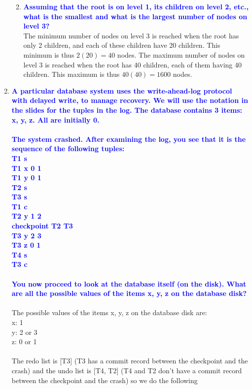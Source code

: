 \documentclass[11pt]{article}
\begin{document}
\begin{enumerate}
\begin{enumerate}
\begin{enumerate}
            \end{enumerate}        
        \item \textbf{\textcolor{blue}{Assuming that the root is on level 1, its children on level 2, etc., what is the smallest and what is the largest number of nodes on level 3?}}
            \\ The minimum number of nodes on level 3 is reached when the root has only 2 children, and each of these children have 20 children. This minimum is thus $2(20) = 40$ nodes. The maximum number of nodes on level 3 is reached when the root has 40 children, each of them having 40 children. This maximum is thus $40(40) = 1600$ nodes.
    \end{enumerate}

\item \textbf{\textcolor{blue}{A particular database system uses the write-ahead-log protocol with delayed write, to manage recovery. We will use the notation in the slides for the tuples in the log. The database contains 3 items: x, y, z. All are initially 0.
\\\\The system crashed. After examining the log, you see that it is the sequence of the following tuples:
\\ T1 s
\\ T1 x 0 1
\\ T1 y 0 1
\\ T2 s
\\ T3 s
\\ T1 c
\\ T2 y 1 2
\\ checkpoint T2 T3
\\ T3 y 2 3
\\ T3 z 0 1
\\ T4 s
\\ T3 c
\\\\ You now proceed to look at the database itself (on the disk). What are all the possible values of the items x, y, z on the database disk?}}
    \\\\ The possible values of the items x, y, z on the database disk are:
    \\ x: 1
    \\ y: 2 or 3
    \\ z: 0 or 1
    \\\\ The redo list is [T3] (T3 has a commit record between the checkpoint and the crash) and the undo list is [T4, T2] (T4 and T2 don't have a commit record between the checkpoint and the crash) so we do the following

\end{enumerate}
\end{document}
